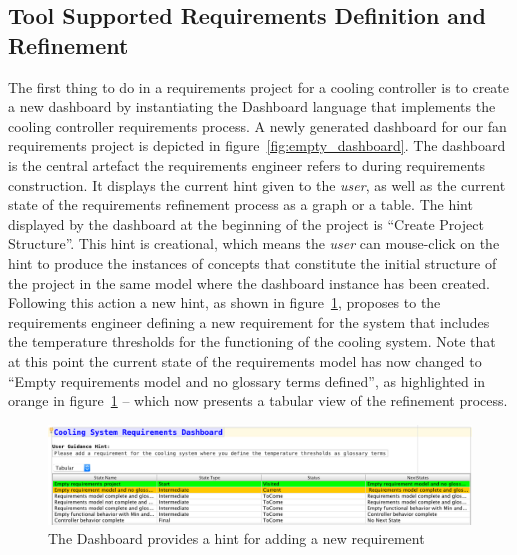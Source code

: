 \subsection*{Tool Supported Requirements Definition and Refinement}
\vspace{-.1cm}
The first thing to do in a requirements project for a cooling controller is to
create a new dashboard by instantiating the \textsf{Dashboard} language that
implements the cooling controller requirements process. A newly generated
dashboard for our fan requirements project is depicted in
figure~\ref{fig:empty_dashboard}.
The dashboard is the central artefact the requirements engineer refers to during
requirements construction. It displays the current hint given to the
\emph{user}, as well as the current state of the requirements refinement process
as a graph or a table. The hint displayed by the dashboard at the beginning of
the project is ``Create Project Structure''. This hint is creational, which
means the \emph{user} can mouse-click on the hint to produce the instances of
concepts that constitute the initial structure of the project in the same model
where the dashboard instance has been created. Following this action a new hint,
as shown in figure~\ref{fig:dashboard_newreq}, proposes to the requirements
engineer defining a new requirement for the system that includes the temperature
thresholds for the functioning of the cooling system.
Note that at this point the current state of the requirements model has now
changed to ``Empty requirements model and no glossary terms defined'', as
highlighted in orange in figure~\ref{fig:dashboard_newreq} -- which now presents
a tabular view of the refinement process.
\vspace{-.6cm}
\begin{figure}[!h]
\centering 
\includegraphics[width=1\textwidth]{./figures/DefineCoolingReq.png}
\vspace{-.7cm}
\caption{The Dashboard provides a hint for adding a new requirement}
\label{fig:dashboard_newreq}
\vspace{-.4cm}
\end{figure}

